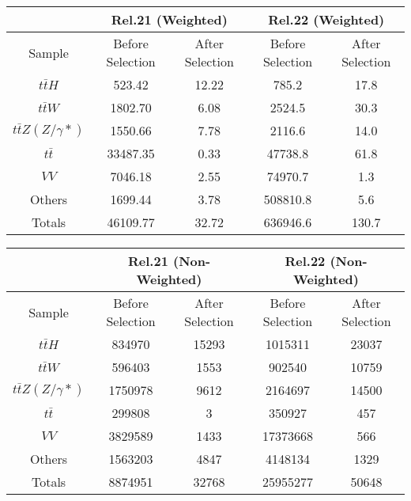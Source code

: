 \begin{table}[ht!]
    \centering
    \begin{tabular}{|c|c|c|c|c|}
        \hline
         & \multicolumn{2}{c|}{Rel.21 (Weighted)} & \multicolumn{2}{c|}{Rel.22 (Weighted)} \\ \hline 
        Sample & Before Selection & After Selection & Before Selection & After Selection \\ \hline
        $t\bar{t}H$ & 523.42 & 12.22 & 785.2 & 17.8 \\ \hline
        $t\bar{t}W$ & 1802.70 & 6.08 & 2524.5 & 30.3 \\ \hline
        $t\bar{t}Z(Z/\gamma*)$ & 1550.66 & 7.78 & 2116.6 & 14.0 \\ \hline
        $t\bar{t}$ & 33487.35 & 0.33 & 47738.8 & 61.8 \\ \hline
        $VV$ & 7046.18 & 2.55 & 74970.7 & 1.3 \\ \hline
        Others & 1699.44 & 3.78 & 508810.8 & 5.6 \\ \hline\hline
        Totals & 46109.77 & 32.72 & 636946.6 & 130.7 \\ \hline
    \end{tabular}
\end{table}



\begin{table}[ht!]
    \centering
    \begin{tabular}{|c|c|c|c|c|}
        \hline
         & \multicolumn{2}{c|}{Rel.21 (Non-Weighted)} & \multicolumn{2}{c|}{Rel.22 (Non-Weighted)} \\ \hline 
        Sample & Before Selection & After Selection & Before Selection & After Selection \\ \hline
        $t\bar{t}H$ & 834970 & 15293 & 1015311 & 23037 \\ \hline
        $t\bar{t}W$ & 596403 & 1553 & 902540 & 10759 \\ \hline
        $t\bar{t}Z(Z/\gamma*)$ & 1750978 & 9612 & 2164697 & 14500 \\ \hline
        $t\bar{t}$ & 299808 & 3 & 350927 & 457 \\ \hline
        $VV$ & 3829589 & 1433 & 17373668 & 566 \\ \hline
        Others & 1563203 & 4847 & 4148134 & 1329 \\ \hline\hline
        Totals & 8874951 & 32768 & 25955277 & 50648 \\ \hline
    \end{tabular}
\end{table}